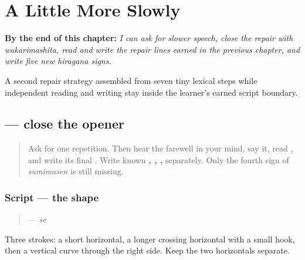 
\chapter{A Little More Slowly}
\label{ch:ja-slower-please}

\begin{chapteropening}
\textbf{By the end of this chapter:} \emph{I can ask for slower speech, close the repair with wakarimashita, read and write the repair lines earned in the previous chapter, and write five new hiragana signs.}

A second repair strategy assembled from seven tiny lexical steps while independent reading and writing stay inside the learner's earned script boundary.
\end{chapteropening}

\section[\texorpdfstring{\ja{せ} (se)}{せ (se)}]{ — close the opener}

\label{lesson:JA-W10-se}



\begin{quote}
Ask for one repetition. Then hear the farewell in your mind, say it, read \textbf{}, and write its final \textbf{}. Write known \textbf{, , , } separately. Only the fourth sign of \emph{sumimasen} is still missing.
\end{quote}

\subsection*{Script — the shape}

\begin{quote}
\textbf{} — \emph{se}
\end{quote}

Three strokes: a short horizontal, a longer crossing horizontal with a small hook, then a vertical curve through the right side. Keep the two horizontals separate.

